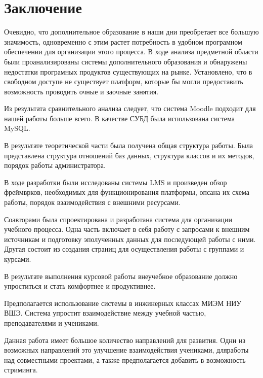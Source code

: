 \documentclass[a4paper,14pt]{article}
\begin{document}

\section{Заключение}


Очевидно, что дополнительное образование в наши дни преобретает все большую значимость, одновременно с этим растет потребность в удобном програмном обеспечении для организации этого процесса.
В ходе анализа предметной области были проанализированы системы дополнительного образования и обнаружены недостатки програмных продуктов существующих на рынке.
Установлено, что в свободном доступе не существует платформ, которые бы могли предоставить возможность проводить очные и заочные занятия.

Из результата сравнительного анализа следует, что система Moodle подходит для нашей работы больше всего. В качестве СУБД была использована система MySQL.

В результате теоретической части была получена общая структура работы. Была представлена структура отношений баз данных, структура классов и их методов, порядок работы администратора.


В ходе разработки были исследованы системы 
LMS и произведен обзор фреймврков, необходимых для функционирования платформы, опсана их схема работы, порядок взаимодействия с внешними ресурсами.



Соавторами была спроектирована и разработана система для организации учебного процесса.
Одна часть включает в себя работу с запросами к внешним источникам и подготовку эполученных данных для последующей работы с ними.
Другая состоит из создания страниц для осуществления работы с группами и курсами.


В результате выполнения курсовой работы внеучебное образование должно упроститься и стать комфортнее и продуктивнее.


Предполагается использование системы в инжинерных классах  МИЭМ НИУ ВШЭ.
Система упростит взаимодействие между учебной частью, преподавателями и учениками.


Данная работа имеет большое количество направлений для развития.
Одни из возможных направлений это улучшение взаимодействия учениками, дляработы над совместными проектами, а также предполагается добавить в возможность стриминга.  

\end{document}

